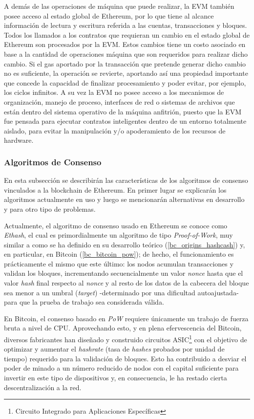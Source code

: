 \begin{itemize}
A demás de las operaciones de máquina que puede realizar, la EVM también posee acceso al estado global de Ethereum, por lo que tiene al alcance información de lectura y escritura referida a las cuentas, transacciones y bloques. Todos los llamados a los contratos que requieran un cambio en el estado global de Ethereum son procesados por la EVM. Estos cambios tiene un costo asociado en base a la cantidad de operaciones máquina que son requeridos para realizar dicho cambio. Si el gas aportado por la transacción que pretende generar dicho cambio no es suficiente, la operación se revierte, aportando así una propiedad importante que concede la capacidad de finalizar procesamiento y poder evitar, por ejemplo, los ciclos infinitos. A su vez la EVM no posee acceso a los mecanismos de organización, manejo de proceso, interfaces de red o sistemas de archivos que están dentro del sistema operativo de la máquina anfitrión, puesto que la EVM fue pensada para ejecutar contratos inteligentes dentro de un entorno totalmente aislado, para evitar la manipulación y/o apoderamiento de los recursos de hardware.
\end{itemize}

\subsubsection{Algoritmos de Consenso}
\label{bc_ethereum_consensus}

En esta subsección se describirán las características de los algoritmos de consenso vinculados a la blockchain de Ethereum. En primer lugar se explicarán los algoritmos actualmente en uso y luego se mencionarán alternativas en desarrollo y para otro tipo de problemas.

Actualmente, el algoritmo de consenso usado en Ethereum se conoce como \textit{Ethash}, el cual es primordialmente un algoritmo de tipo \textit{Proof-of-Work}, muy similar a como se ha definido en su desarrollo teórico (\ref{bc_origins_hashcash}) y, en particular, en Bitcoin (\ref{bc_bitcoin_pow}); de hecho, el funcionamiento es prácticamente el mismo que este último: los nodos acumulan transacciones y validan los bloques, incrementando secuencialmente un valor \textit{nonce} hasta que el valor \textit{hash} final respecto al \textit{nonce} y al resto de los datos de la cabecera del bloque sea menor a un umbral (\textit{target}) -determinado por una dificultad autoajustada- para que la prueba de trabajo sea considerada válida.

 En Bitcoin, el consenso basado en \textit{PoW} requiere únicamente un trabajo de fuerza bruta a nivel de CPU. Aprovechando esto, y en plena efervescencia del Bitcoin, diversos fabricantes han diseñado y construido circuitos ASIC\footnote{Circuito Integrado para Aplicaciones Específicas} con el objetivo de optimizar y aumentar el \textit{hashrate} (tasa de \textit{hashes} probados por unidad de tiempo) requerido para la validación de bloques. Esto ha contribuido a desviar el poder de minado a un número reducido de nodos con el capital suficiente para invertir en este tipo de dispositivos y, en consecuencia, le ha restado cierta descentralización a la red.

